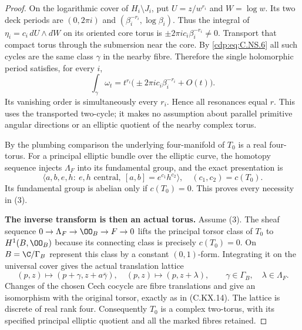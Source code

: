 \begin{proof}
On the logarithmic cover of $H_i\setminus J_i$,
put $U=z/w^{r_i}$ and $W=\log w$. Its two deck
periods are
$(0,2\pi i)$ and $(\beta_i^{-r_i},\log\beta_i)$.
Thus the integral of $\eta_i=c_i\,dU\wedge dW$
on its oriented core torus is
$\pm2\pi i c_i\beta_i^{-r_i}\ne0$.
Transport that compact torus through the
submersion near the core. By \eqref{cdp:eq:C.NS.6} all such
cycles are the same class $\gamma$ in the
nearby fibre. Therefore the single holomorphic
period satisfies, for every $i$,
\[
        \int_\gamma\omega_t
             =t^{r_i}\bigl(\pm2\pi i c_i\beta_i^{-r_i}
                              +O(t)\bigr).              \tag{C.NS.12}\label{cdp:eq:C.NS.12}
\]
Its vanishing order is simultaneously every
$r_i$. Hence all resonances equal $r$.
This uses the transported two-cycle; it makes
no assumption about parallel primitive angular
directions or an elliptic quotient of the
nearby complex torus.

By the plumbing comparison the underlying
four-manifold of $T_0$ is a real four-torus.
For a principal elliptic bundle over the
elliptic curve, the homotopy sequence injects
$\Lambda_F$ into its fundamental group, and
the exact presentation is
\[
 \langle a,b,e,h:\ e,h\text{ central},\
             [a,b]=e^{c_1}h^{c_2}\rangle,
                         \quad(c_1,c_2)=c(T_0).          \tag{C.NS.13}\label{cdp:eq:C.NS.13}
\]
Its fundamental group is abelian only if
$c(T_0)=0$. This proves every necessity in (3).

\par\medskip\noindent\textbf{The inverse transform is then an actual torus.}
Assume (3). The sheaf sequence
$0\to\Lambda_F\to\OO_B\to F\to0$ lifts the
principal torsor class of $T_0$ to $H^1(B,\OO_B)$
because its connecting class is precisely
$c(T_0)=0$. On $B=\C/\Gamma_B$ represent this
class by a constant $(0,1)$-form. Integrating it
on the universal cover gives the actual
translation lattice
\[
 (p,z)\mapsto(p+\gamma,z+a\bar\gamma),\quad
 (p,z)\mapsto(p,z+\lambda),
       \qquad \gamma\in\Gamma_B,\quad\lambda\in\Lambda_F.
                                                        \tag{C.NS.14}\label{cdp:eq:C.NS.14}
\]
Changes of the chosen Cech cocycle are fibre
translations and give an isomorphism with the
original torsor, exactly as in (C.KX.14).
The lattice is discrete of real rank four.
Consequently $T_0$ is a complex two-torus,
with its specified principal elliptic quotient
and all the marked fibres retained.


\end{proof}

